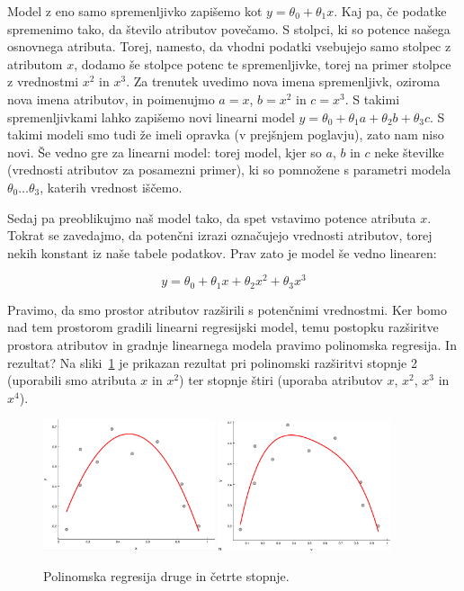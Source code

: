 Model z eno samo spremenljivko zapišemo kot $y=\theta_0 + \theta_1 x$. Kaj pa, če podatke spremenimo tako, da število atributov povečamo. S stolpci, ki so potence našega osnovnega atributa. Torej, namesto, da vhodni podatki vsebujejo samo stolpec z atributom $x$, dodamo še stolpce potenc te spremenljivke, torej na primer stolpce z vrednostmi $x^2$ in $x^3$. Za trenutek uvedimo nova imena spremenljivk, oziroma nova imena atributov, in poimenujmo $a=x$, $b=x^2$ in $c=x^3$. S takimi spremenljivkami lahko zapišemo novi linearni model $y=\theta_0 + \theta_1 a + \theta_2 b + \theta_3 c$. S takimi modeli smo tudi že imeli opravka (v prejšnjem poglavju), zato nam niso novi. Še vedno gre za linearni model: torej model, kjer so $a$, $b$ in $c$ neke številke (vrednosti atributov za posamezni primer), ki so pomnožene s parametri modela $\theta_0\ldots\theta_3$, katerih vrednost iščemo.

Sedaj pa preoblikujmo naš model tako, da spet vstavimo potence atributa $x$. Tokrat se zavedajmo, da potenčni izrazi označujejo vrednosti atributov, torej nekih konstant iz naše tabele podatkov. Prav zato je model še vedno linearen:

$$ y=\theta_0 + \theta_1 x + \theta_2 x^2 + \theta_3 x^3 $$

Pravimo, da smo prostor atributov razširili s potenčnimi vrednostmi. Ker bomo nad tem prostorom gradili linearni regresijski model, temu postopku razširitve prostora atributov in gradnje linearnega modela pravimo polinomska regresija. In rezultat? Na sliki~\ref{fig:poly-linear-fit} je prikazan rezultat pri polinomski razširitvi stopnje 2 (uporabili smo atributa $x$ in $x^2$) ter stopnje štiri (uporaba atributov $x$, $x^2$, $x^3$ in $x^4$).

\begin{figure}[htbp]
\begin{center}
  \includegraphics[width=0.45\textwidth]{slike/poly-reg-2.png}\hfill
  \includegraphics[width=0.45\textwidth]{slike/poly-reg-4.png}
\caption{Polinomska regresija druge in četrte stopnje.}
\label{fig:poly-linear-fit}
\end{center}
\end{figure}

